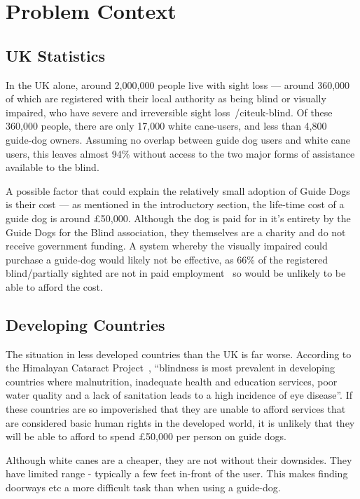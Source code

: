 \section{Problem Context}
\subsection{UK Statistics}
In the UK alone, around 2,000,000 people live with sight loss --- around 360,000 of which are registered with their local authority as being blind or visually impaired, who have severe and irreversible sight loss~/cite{uk-blind}.  Of these 360,000 people, there are only 17,000 white cane-users, and less than 4,800~\cite{guidedog-count} guide-dog owners. Assuming no overlap between guide dog users and white cane users, this leaves almost 94\% without access to the two major forms of assistance available to the blind.

A possible factor that could explain the relatively small adoption of Guide Dogs is their cost --- as mentioned in the introductory section, the life-time cost of a guide dog is around £50,000. Although the dog is paid for in it's entirety by the Guide Dogs for the Blind association, they themselves are a charity and do not receive government funding. A system whereby the visually impaired could purchase a guide-dog would likely not be effective, as 66\% of the registered blind/partially sighted are not in paid employment~\cite{afbff} so would be unlikely to be able to afford the cost.

\subsection{Developing Countries}
The situation in less developed countries than the UK is far worse. According to the Himalayan Cataract Project~\cite{worldblindness}, ``blindness is most prevalent in developing countries where malnutrition, inadequate health and education services, poor water quality and a lack of sanitation leads to a high incidence of eye disease''. If these countries are so impoverished that they are unable to afford services that are considered basic human rights in the developed world, it is unlikely that they will be able to afford to spend £50,000 per person on guide dogs. 

Although white canes are a cheaper, they are not without their downsides. They have limited range - typically a few feet in-front of the user. This makes finding doorways etc a more difficult task than when using a guide-dog. 

